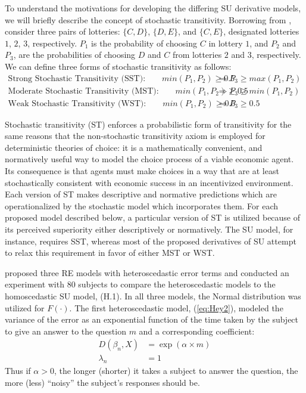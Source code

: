 \documentclass[11pt,a4paper]{article}
\begin{document}
To understand the motivations for developing the differing SU derivative models, we will briefly describe the concept of stochastic transitivity.
Borrowing from \textcite[210]{Wilcox2008}, consider three pairs of lotteries: $\{C,D\}$, $\{D,E\}$, and $\{C,E\}$, designated lotteries $1$, $2$, $3$, respectively.
$P_1$ is the probability of choosing $C$ in lottery $1$, and $P_2$ and $P_3$, are the probabilities of choosing $D$ and $C$ from lotteries $2$ and $3$, respectively.
We can define three forms of stochastic transitivity as follows:
\begin{align*}
	\text{Strong Stochastic Transitivity (SST):} \qquad \mathit{min}(P_1,P_2) \geq 0.5 &\Rightarrow P_3 \geq \mathit{max}(P_1,P_2) \\
	\text{Moderate Stochastic Transitivity (MST):} \qquad \mathit{min}(P_1,P_2) \geq 0.5 &\Rightarrow P_3 \geq \mathit{min}(P_1,P_2)\\
	\text{Weak Stochastic Transitivity (WST):} \qquad \mathit{min}(P_1,P_2) \geq 0.5 &\Rightarrow P_3 \geq 0.5
\end{align*}

Stochastic transitivity (ST) enforces a probabilistic form of transitivity for the same reasons that the non-stochastic transitivity axiom is employed for deterministic theories of choice: it is a mathematically convenient, and normatively useful way to model the choice process of a viable economic agent.
Its consequence is that agents must make choices in a way that are at least stochastically consistent with economic success in an incentivized environment.
Each version of ST makes descriptive and normative predictions which are operationalized by the stochastic model which incorporates them.
For each proposed model described below, a particular version of ST is utilized because of its perceived superiority either descriptively or normatively.
The SU model, for instance, requires SST, whereas most of the proposed derivatives of SU attempt to relax this requirement in favor of either MST or WST.

\textcite{Hey1995a} proposed three RE models with heteroscedastic error terms and conducted an experiment with 80 subjects to compare the heteroscedastic models to the homoscedastic SU model, (H.1).
In all three models, the Normal distribution was utilized for $F(\cdot)$.
The first heteroscedastic model, (\ref{eq:Hey2}), modeled the variance of the error as an exponential function of the time taken by the subject to give an answer to the question $m$ and a corresponding coefficient:
\begin{align*}
	\tag{H.2}
	\label{eq:Hey2}
	D(\beta_n,X) &= \exp(\alpha \times m)\\
	\lambda_n &= 1
\end{align*}
Thus if $\alpha > 0$, the longer (shorter) it takes a subject to answer the question, the more (less) \enquote{noisy} the subject's responses should be.
\end{document}
